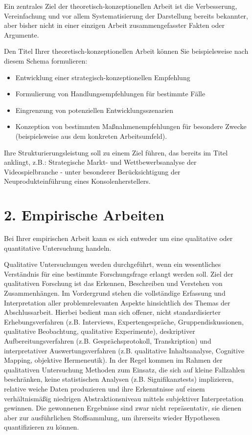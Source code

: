 Ein zentrales Ziel der theoretisch-konzeptionellen Arbeit ist die Verbesserung, Vereinfachung und vor allem Systematisierung der Darstellung bereits bekannter, aber bisher nicht in einer einzigen Arbeit zusammengefasster Fakten oder Argumente.

Den Titel Ihrer theoretisch-konzeptionellen Arbeit können Sie beispielsweise nach diesem Schema formulieren:
\begin{itemize}
\item Entwicklung einer strategisch-konzeptionellen Empfehlung
\item Formulierung von Handlungsempfehlungen für bestimmte Fälle
\item Eingrenzung von potenziellen Entwicklungsszenarien
\item Konzeption von bestimmten Maßnahmenempfehlungen für besondere Zwecke (beispielsweise aus dem konkreten Arbeitsumfeld).
\end{itemize}

Ihre Strukturierungsleistung soll zu einem Ziel führen, das bereits im Titel anklingt, z.B.: \glqq Strategische Markt- und Wettbewerbsanalyse der Videospielbranche - unter besonderer Berücksichtigung der Neuprodukteinführung eines Konsolenherstellers\grqq{}.

\section*{2. Empirische Arbeiten}

Bei Ihrer empirischen Arbeit kann es sich entweder um eine qualitative oder quantitative Untersuchung handeln.

Qualitative Untersuchungen werden durchgeführt, wenn ein wesentliches Verständnis für eine bestimmte Forschungsfrage erlangt werden soll. Ziel der qualitativen Forschung ist das Erkennen, Beschreiben und Verstehen von Zusammenhängen. Im Vordergrund stehen die vollständige Erfassung und Interpretation aller problemrelevanten Aspekte hinsichtlich des Themas der Abschlussarbeit. Hierbei bedient man sich offener, nicht standardisierter Erhebungsverfahren (z.B. Interviews, Expertengespräche, Gruppendiskussionen, qualitative Beobachtung, qualitative Experimente), deskriptiver Aufbereitungsverfahren (z.B. Gesprächsprotokoll, Transkription) und interpretativer Auswertungsverfahren (z.B. qualitative Inhaltsanalyse, Cognitive Mapping, objektive Hermeneutik). In der Regel kommen im Rahmen der qualitativen Untersuchung Methoden zum Einsatz, die sich auf kleine Fallzahlen beschränken, keine statistischen Analysen (z.B. Signifikanztests) implizieren, relative weiche Daten produzieren und ihre Erkenntnisse auf einem verhältnismäßig niedrigen Abstraktionsniveau mittels subjektiver Interpretation gewinnen. Die gewonnenen Ergebnisse sind zwar nicht repräsentativ, sie dienen aber zur ausführlichen Stoffsammlung, um ihrerseits wieder Hypothesen quantifizieren zu können.

